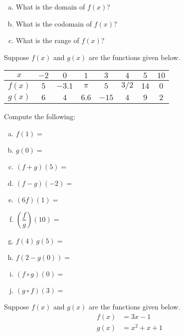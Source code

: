 \documentclass[11pt,letterpaper]{article}
\begin{document}
\begin{enumerate}[(a)]
\item What is the domain of $f(x)$?
\item What is the codomain of $f(x)$?
\item What is the range of $f(x)$?
\end{enumerate}



\newpage



 Suppose $f(x)$ and $g(x)$ are the functions given below. 
        \begin{table}[!ht]
        \centering
        \begin{tabular}{| c || c | c | c | c | c | c | c |} \hline
	$x$ & $-2$ & $0$ & $1$ & $3$ & $4$ & $5$ & $10$ \\ \hline
	$f(x)$ & $5$ & $-3.1$ & $\pi$ & $5$ & $3/2$ & $14$ & $0$ \\ \hline
	$g(x)$ & $6$ & $4$ & $6.6$ & $-15$ & $4$ & $9$ & $2$ \\ \hline
        \end{tabular}
        \end{table}


Compute the following: \pspace
        \begin{enumerate}[(a)]
        \item $f(1)=$ \vfill
        \item $g(0)=$ \vfill
        \item $(f + g)(5)=$ \vfill
        \item $(f - g)(-2)=$ \vfill
        \item $(6f)(1)=$ \vfill
        \item $\left(\dfrac{f}{g}\right)(10)=$ \vfill
        \item $f(4)\, g(5)=$ \vfill
        \item $f(2 - g(0))=$ \vfill
        \item $(f \circ g)(0)=$ \vfill
        \item $(g \circ f)(3)=$ \vfill
        \end{enumerate}



\newpage



 Suppose $f(x)$ and $g(x)$ are the functions given below. 
	\[
	\begin{aligned}
	f(x)&= 3x - 1 \\[0.3cm]
	g(x)&= x^2 + x + 1
	\end{aligned}
	\]
\end{document}
